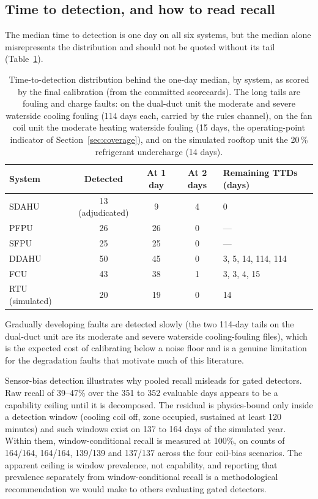 \documentclass[11pt,letterpaper]{article}
\begin{document}
\subsection{Time to detection, and how to read recall}

The median time to detection is one day on all six systems, but the median alone misrepresents the distribution and should not be quoted without its tail (Table~\ref{tab:ttd}).

\begin{table}[htbp]
\centering
\caption{Time-to-detection distribution behind the one-day median, by system, as scored by the final calibration (from the committed scorecards). The long tails are fouling and charge faults: on the dual-duct unit the moderate and severe waterside cooling fouling (114 days each, carried by the rules channel), on the fan coil unit the moderate heating waterside fouling (15 days, the operating-point indicator of Section~\ref{sec:coverage}), and on the simulated rooftop unit the 20\,\% refrigerant undercharge (14 days).}
\label{tab:ttd}
\begin{tabular}{lcccl}
\hline
System & Detected & At 1 day & At 2 days & Remaining TTDs (days) \\
\hline
SDAHU & 13 (adjudicated) & 9 & 4 & 0 \\
PFPU & 26 & 26 & 0 & --- \\
SFPU & 25 & 25 & 0 & --- \\
DDAHU & 50 & 45 & 0 & 3, 5, 14, 114, 114 \\
FCU & 43 & 38 & 1 & 3, 3, 4, 15 \\
RTU (simulated) & 20 & 19 & 0 & 14 \\
\hline
\end{tabular}

\end{table}

Gradually developing faults are detected slowly (the two 114-day tails on the dual-duct unit are its moderate and severe waterside cooling-fouling files), which is the expected cost of calibrating below a noise floor and is a genuine limitation for the degradation faults that motivate much of this literature.

Sensor-bias detection illustrates why pooled recall misleads for gated detectors. Raw recall of 39--47\% over the 351 to 352 evaluable days appears to be a capability ceiling until it is decomposed. The residual is physics-bound only inside a detection window (cooling coil off, zone occupied, sustained at least 120 minutes) and such windows exist on 137 to 164 days of the simulated year. Within them, window-conditional recall is measured at 100\%, on counts of 164/164, 164/164, 139/139 and 137/137 across the four coil-bias scenarios. The apparent ceiling is window prevalence, not capability, and reporting that prevalence separately from window-conditional recall is a methodological recommendation we would make to others evaluating gated detectors.
\end{document}
